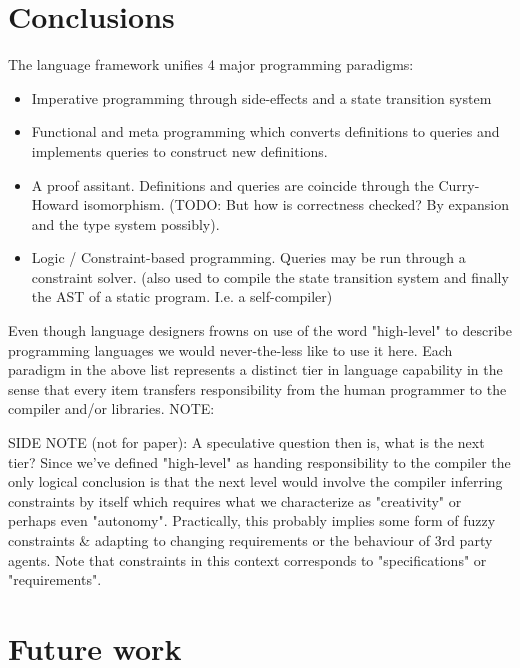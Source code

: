 \documentclass[11pt]{article}
\begin{document}
\section*{Conclusions}

The language framework unifies 4 major programming paradigms: 
\begin{itemize}
\item Imperative programming through side-effects and a state transition system
\item Functional and meta programming which converts definitions to queries and implements queries to construct new definitions.
\item A proof assitant. Definitions and queries are coincide through the Curry-Howard isomorphism. (TODO: But how is correctness checked? By expansion and the type system possibly).
\item Logic / Constraint-based programming. Queries may be run through a constraint solver. (also used to compile the state transition system and finally the AST of a static program. I.e. a self-compiler)
\end{itemize}

Even though language designers frowns on use of the word "high-level" to describe programming languages we would never-the-less like to use it here. 
Each paradigm in the above list represents a distinct tier in language capability in the sense that every item transfers responsibility from the human programmer to the compiler and/or libraries. NOTE: 

SIDE NOTE (not for paper): A speculative question then is, what is the next tier? Since we've defined "high-level" as handing responsibility to the compiler the only logical conclusion is that the next level would involve
the compiler inferring constraints by itself which requires what we characterize as "creativity" or perhaps even "autonomy". Practically, this probably implies some form of fuzzy constraints \& adapting to changing requirements or the behaviour of 3rd party agents.
Note that constraints in this context corresponds to "specifications" or "requirements".

\section*{Future work}



\end{document}
